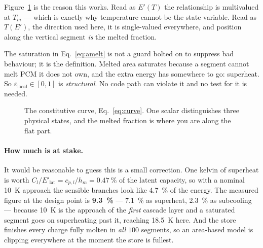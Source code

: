 \documentclass[11pt,a4paper]{article}
\newcommand{\hm}{\ensuremath{h_{m}}}
\newcommand{\Tm}{\ensuremath{T_{m}}}
\newcommand{\Tpcm}{\ensuremath{T_{\mathrm{pcm}}}}
\newcommand{\Elat}{\ensuremath{E'_{\mathrm{lat}}}}
\newcommand{\epsloc}{\ensuremath{\varepsilon_{\mathrm{local}}}}
\begin{document}
Figure~\ref{fig:curve} is the reason this works. Read as $E'(T)$ the
relationship is multivalued at $\Tm$ --- which is exactly why temperature
cannot be the state variable. Read as $T(E')$, the direction used here, it is
single-valued everywhere, and position along the vertical segment \emph{is} the
melted fraction.

The saturation in Eq.~\eqref{eq:amelt} is not a guard bolted on to suppress bad
behaviour; it is the definition. Melted area saturates because a segment cannot
melt PCM it does not own, and the extra energy has somewhere to go: superheat.
So $\epsloc\in[0,1]$ is \emph{structural}. No code path can violate it and no
test for it is needed.

\begin{figure}[htbp]
\centering
{}
\caption{The constitutive curve, Eq.~\eqref{eq:curve}. One scalar distinguishes
three physical states, and the melted fraction is where you are along the flat
part.}
\label{fig:curve}
\end{figure}

\paragraph{How much is at stake.}
It would be reasonable to guess this is a small correction. One kelvin of
superheat is worth $C_l/\Elat=c_{p,l}/\hm=\SI{0.47}{\percent}$ of the latent
capacity, so with a nominal \SI{10}{\kelvin} approach the sensible branches
look like \SI{4.7}{\percent} of the energy. The measured figure at the design
point is \textbf{\SI{9.3}{\percent}} --- \SI{7.1}{\percent} as superheat,
\SI{2.3}{\percent} as subcooling --- because \SI{10}{\kelvin} is the approach of
the \emph{first} cascade layer and a saturated segment goes on superheating past
it, reaching \SI{18.5}{\kelvin} here. And the store finishes every charge fully
molten in \emph{all} $100$ segments, so an area-based model is clipping
everywhere at the moment the store is fullest.
\end{document}
